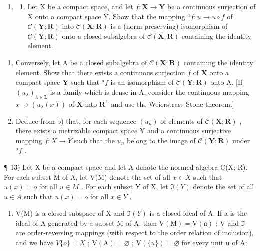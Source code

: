 \begin{enumerate}
\def\labelenumi{\arabic{enumi})}
\setcounter{enumi}{11}
\tightlist
\item
  \begin{enumerate}
  \def\labelenumii{\alph{enumii})}
  \tightlist
  \item
    Let X be a compact space, and let \(f: \mathbf{X} \to \mathbf{Y}\) be a continuous surjection of X onto a compact space Y. Show that the mapping \(^{a}f: u \to u \circ f\) of \(\mathcal{C}(\mathbf{Y}; \mathbf{R})\) into \(\mathcal{C}(\mathbf{X}; \mathbf{R})\) is a (norm-preserving) isomorphism of \(\mathcal{C}(\mathbf{Y}; \mathbf{R})\) onto a closed subalgebra of \(\mathcal{C}(\mathbf{X}; \mathbf{R})\) containing the identity element.
  \end{enumerate}
\end{enumerate}

\begin{enumerate}
\def\labelenumi{\alph{enumi})}
\setcounter{enumi}{1}
\item
  Conversely, let A be a closed subalgebra of \(\mathcal{C}(\mathbf{X};\mathbf{R})\) containing the identity element. Show that there exists a continuous surjection \(f\) of \(\mathbf{X}\) onto a compact space \(\mathbf{Y}\) such that \(^a f\) is an isomorphism of \(\mathcal{C}(\mathbf{Y};\mathbf{R})\) onto A. {[}If \((u_{\lambda})_{\lambda \in \mathbf{L}}\) is a family which is dense in A, consider the continuous mapping \(x\to (u_{\lambda}(x))\) of \(\mathbf{X}\) into \(\mathbf{R}^{\mathrm{L}}\) and use the Weierstrass-Stone theorem.{]}
\item
  Deduce from b) that, for each sequence \((u_{n})\) of elements of \(\mathcal{C}(\mathbf{X};\mathbf{R})\) , there exists a metrizable compact space Y and a continuous surjective mapping \(f: X \to Y\) such that the \(u_{n}\) belong to the image of \(\mathcal{C}(\mathbf{Y};\mathbf{R})\) under \(^{a}f\) .
\end{enumerate}

¶ 13) Let X be a compact space and let A denote the normed algebra C(X; R). For each subset M of A, let V(M) denote the set of all \(x \in X\) such that \(u(x) = o\) for all \(u \in M\) . For each subset Y of X, let \(\Im(Y)\) denote the set of all \(u \in A\) such that \(u(x) = o\) for all \(x \in Y\) .

\begin{enumerate}
\def\labelenumi{\alph{enumi})}
\tightlist
\item
  V(M) is a closed subspace of X and \(\Im(Y)\) is a closed ideal of A. If a is the ideal of A generated by a subset M of A, then \(\mathrm{V}(\mathrm{M})=\mathrm{V}(\mathfrak{a})\) ; V and \(\Im\) are order-reversing mappings (with respect to the order relation of inclusion), and we have \(V\{o\}=X\) ; \(\mathrm{V}(\mathrm{A})=\varnothing\) ; \(\mathrm{V}(\{u\})=\varnothing\) for every unit u of A;
\end{enumerate}

